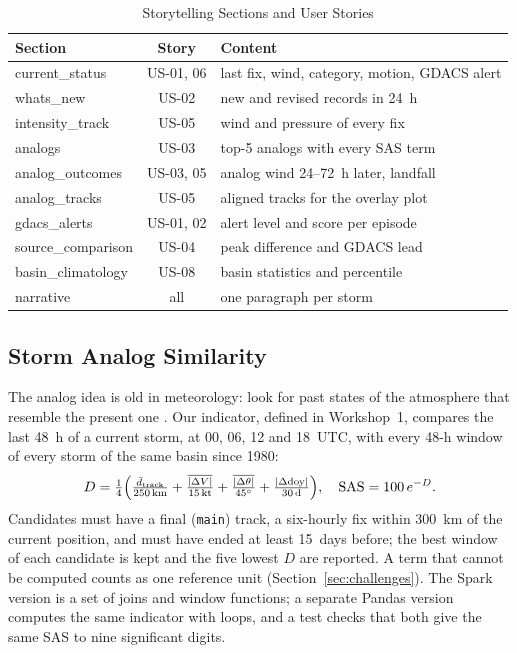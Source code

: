\documentclass[10pt,twocolumn,letterpaper]{article}
\newcommand{\code}[1]{\texttt{\footnotesize #1}}
\begin{document}
\begin{table}[t]
\caption{Storytelling Sections and User Stories}\label{tab:sections}
\centering\footnotesize
\begin{tabularx}{\columnwidth}{@{}L{2.1cm} c Y@{}}
\toprule
Section & Story & Content\\
\midrule
current\_status & US-01, 06 & last fix, wind, category, motion, GDACS alert\\
whats\_new & US-02 & new and revised records in 24~h\\
intensity\_track & US-05 & wind and pressure of every fix\\
analogs & US-03 & top-5 analogs with every SAS term\\
analog\_outcomes & US-03, 05 & analog wind 24--72~h later, landfall\\
analog\_tracks & US-05 & aligned tracks for the overlay plot\\
gdacs\_alerts & US-01, 02 & alert level and score per episode\\
source\_comparison & US-04 & peak difference and GDACS lead\\
basin\_climatology & US-08 & basin statistics and percentile\\
narrative & all & one paragraph per storm\\
\bottomrule
\end{tabularx}
\end{table}

\subsection{Storm Analog Similarity}
The analog idea is old in meteorology: look for past states of the atmosphere that resemble the present one \cite{lorenz}. Our indicator, defined in Workshop~1, compares the last 48~h of a current storm, at 00, 06, 12 and 18~UTC, with every 48-h window of every storm of the same basin since 1980:
\begin{equation}
D=\tfrac14\Bigl(\tfrac{\bar d_{\mathrm{track}}}{250\,\mathrm{km}}+\tfrac{\overline{|\Delta V|}}{15\,\mathrm{kt}}+\tfrac{\overline{|\Delta\theta|}}{45^\circ}+\tfrac{|\Delta\mathrm{doy}|}{30\,\mathrm{d}}\Bigr),\quad \mathrm{SAS}=100\,e^{-D}.
\end{equation}
Candidates must have a final (\code{main}) track, a six-hourly fix within 300~km of the current position, and must have ended at least 15~days before; the best window of each candidate is kept and the five lowest $D$ are reported. A term that cannot be computed counts as one reference unit (Section~\ref{sec:challenges}). The Spark version is a set of joins and window functions; a separate Pandas version computes the same indicator with loops, and a test checks that both give the same SAS to nine significant digits.
\end{document}
